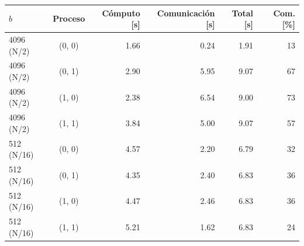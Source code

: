 \begin{tabular}{lcrrrr}
\toprule
$b$ & Proceso & Cómputo [s] & Comunicación [s] & Total [s] & Com. [\%] \\
\midrule
4096 (N/2) & (0, 0) & 1.66 & 0.24 & 1.91 & 13 \\
4096 (N/2) & (0, 1) & 2.90 & 5.95 & 9.07 & 67 \\
4096 (N/2) & (1, 0) & 2.38 & 6.54 & 9.00 & 73 \\
4096 (N/2) & (1, 1) & 3.84 & 5.00 & 9.07 & 57 \\
512 (N/16) & (0, 0) & 4.57 & 2.20 & 6.79 & 32 \\
512 (N/16) & (0, 1) & 4.35 & 2.40 & 6.83 & 36 \\
512 (N/16) & (1, 0) & 4.47 & 2.46 & 6.83 & 36 \\
512 (N/16) & (1, 1) & 5.21 & 1.62 & 6.83 & 24 \\
\bottomrule
\end{tabular}

